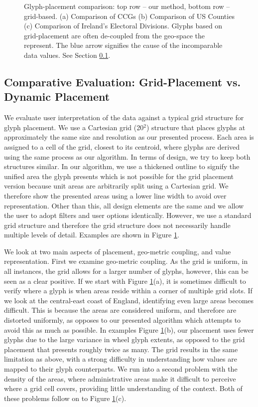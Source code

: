\begin{figure}
\caption{Glyph-placement comparison: top row -- our method, bottom row -- grid-based. (a) Comparison of CCGs (b) Comparison of US Counties (c) Comparison of Ireland's Electoral Divisions. Glyphs based on grid-placement are often de-coupled from the geo-space the represent. The blue arrow signifies the cause of the incomparable data values. See Section \ref{sec:grid}. } \label{fig:compare} \label{fig:grid}
\end{figure}
\subsection{Comparative Evaluation: Grid-Placement vs. Dynamic Placement} \label{sec:grid}
We evaluate user interpretation of the data against a typical grid structure for glyph placement. We use a Cartesian grid (20$^2$) structure that places glyphs at approximately the same size and resolution as our presented process. Each area is assigned to a cell of the grid, closest to its centroid, where glyphs are derived using the same process as our algorithm. In terms of design, we try to keep both structures similar. In our algorithm, we use a thickened outline to signify the unified area the glyph presents which is not possible for the grid placement version because unit areas are arbitrarily split using a Cartesian grid. We therefore show the presented areas using a lower line width to avoid over representation. Other than this, all design elements are the same and we allow the user to adopt filters and user options identically. However, we use a standard grid structure and therefore the grid structure does not necessarily handle multiple levels of detail. Examples are shown in Figure \ref{fig:grid}.

We look at two main aspects of placement, geo-metric coupling, and value representation. First we examine geo-metric coupling. As the grid is uniform, in all instances, the grid allows for a larger number of glyphs, however, this can be seen as a clear positive. If we start with Figure \ref{fig:grid}(a), it is sometimes difficult to verify where a glyph is when areas reside within a corner of multiple grid slots. If we look at the central-east coast of England, identifying even large areas becomes difficult. This is because the areas are considered uniform, and therefore are distorted uniformly, as opposes to our presented algorithm which attempts to avoid this as much as possible.  In examples Figure \ref{fig:grid}(b), our placement uses fewer glyphs due to the large variance in wheel glyph extents, as opposed to the grid placement that presents roughly twice as many. The grid results in the same limitation as above, with a strong difficulty in understanding how values are mapped to their glyph counterparts. We run into a second problem with the density of the areas, where administrative areas make it difficult to perceive where a grid cell covers, providing little understanding of the context. Both of these problems follow on to Figure \ref{fig:grid}(c).

